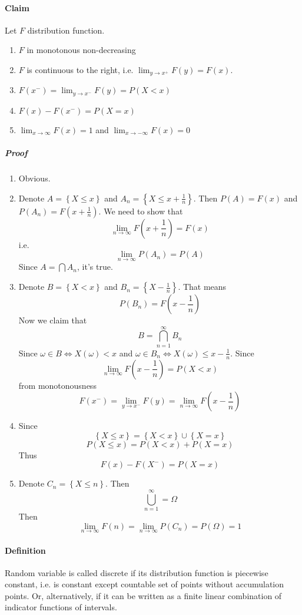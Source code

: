 \paragraph{Claim}
Let $F$ distribution function. 
\begin{enumerate}
	\item $F$ in monotonous non-decreasing
	\item $F$ is continuous to the right, i.e. $\lim_{y \to x^+} F(y) = F(x)$.
	\item $F(x^-) = \lim_{y \to x^-} F(y) = P(X<x)$
	\item $F(x) - F(x^-) = P(X=x)$
	\item $\lim_{x \to \infty} F(x) = 1$ and $\lim_{x \to -\infty} F(x) = 0$
\end{enumerate}
\subparagraph{Proof}
\begin{enumerate}
\item Obvious.
\item Denote $A = \left\{ X \leq x \right\}$ and $A_n= \left\{ X \leq x+\frac{1}{n} \right\}$. Then $P(A) = F(x)$ and $P(A_n) = F(x+\frac{1}{n})$. We need to show that
$$\lim_{n \to \infty} F(x+\frac{1}{n}) = F(x)$$
i.e.
$$\lim_{n \to \infty} P(A_n) = P(A)$$
Since $A = \bigcap A_n$, it's true.
\item Denote $B = \left\{ X < x \right\}$ and $B_n = \left\{ X - \frac{1}{n} \right\}$. That means
$$P(B_n) = F(x-\frac{1}{n})$$
Now we claim that 
$$B = \bigcap_{n=1}^\infty B_n$$
Since $\omega \in B \iff X(\omega) < x$ and $\omega \in B_n \iff X(\omega) \leq x - \frac{1}{n}$.
Since
$$\lim_{n \to \infty} F(x-\frac{1}{n}) = P(X<x) $$
from monotonousness
$$F(x^-) =  \lim_{y \to x^-} F(y) =\lim_{n \to \infty} F(x-\frac{1}{n})$$
\item Since $$\left\{ X \leq x \right\} = \left\{ X <x \right\} \cup \left\{  X  = x \right\}$$
$$P(X \leq x) = P(X < x) + P(X=x)$$
Thus
$$F(x) - F(X^-) = P(X=x)$$
\item Denote $C_n = \left\{ X \leq n \right\}$. Then
$$\bigcup_{n=1}^\infty  = \Omega$$
Then
$$\lim_{n \to \infty} F(n) = \lim_{n \to \infty} P(C_n) = P(\Omega) = 1$$
\end{enumerate}
\paragraph{Definition}
Random variable is called discrete if its distribution function is piecewise constant, i.e. is constant except countable set of points without accumulation points. Or, alternatively, if it can be written as a finite linear combination of indicator functions of intervals. 

